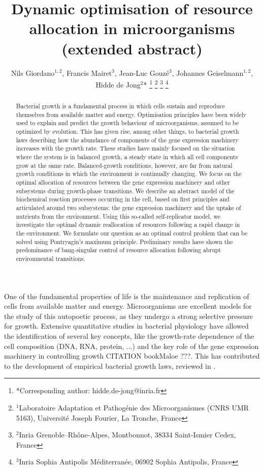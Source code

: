 \documentclass[a4paper, 10pt, conference]{ieeeconf}      %
\title{\LARGE \bf
Dynamic optimisation of resource allocation in microorganisms (extended abstract)
}
\author{Nils Giordano$^{1,2}$, Francis Mairet$^{3}$, Jean-Luc Gouzé$^{3}$, Johannes Geiselmann$^{1,2}$, Hidde de Jong$^{2}$*%
\thanks{*Corresponding author: hidde.de-jong@inria.fr}%
\thanks{$^{1}$Laboratoire Adaptation et Pathog\'enie des Microorganismes (CNRS UMR 5163),
Universit\'e Joseph Fourier,
La Tronche, France}
\thanks{$^{2}$Inria Grenoble--Rh\^one-Alpes, Montbonnot, 38334 Saint-Ismier Cedex, France}
\thanks{$^{3}$Inria Sophia Antipolis M\'editerran\'ee, 06902 Sophia Antipolis, France}
}
\begin{document}
\maketitle
\thispagestyle{empty}
\pagestyle{empty}
\begin{abstract}

Bacterial growth is a fundamental process in which cells sustain and reproduce themselves from available matter and energy.
Optimisation principles have been widely used to explain and predict the growth behaviour of microorganisms, assumed to be optimized by evolution.
This has given rise, among other things, to bacterial growth laws describing how the abundance of components of the gene expression machinery increases with the growth rate. These studies have mainly focused on the situation where the system is in balanced growth, a steady state in which all cell components grow at the same rate.
Balanced-growth conditions, however, are far from natural growth conditions in which the environment is continually changing.
We focus on the optimal allocation of resources between the gene expression machinery and other subsystems during growth-phase transitions.
We describe an abstract model of the biochemical reaction processes occurring in the cell, based on first principles and articulated around two subsystems: the gene expression machinery and the uptake of nutrients from the environment.
Using this so-called self-replicator model, we investigate the optimal dynamic reallocation of resources following a rapid change in the environment.
We formulate our question as an optimal control problem that can be solved using Pontryagin's maximum principle.
Preliminary results have shown the predominance of bang-singular control of resource allocation following abrupt environmental transitions.
\end{abstract}

One of the fundamental properties of life is the maintenance and replication of cells from available matter and energy.
Microorganisms are excellent models for the study of this autopoetic process, as they undergo a strong selective pressure for growth.
Extensive quantitative studies in bacterial physiology have allowed the identification of several key concepts, like the growth-rate dependence of the cell composition (DNA, RNA, protein, ...) and the key role of the gene expression machinery in controlling growth \cite{scott_interdependence_2010,bremer_modulation_1996,bookMaloe} {\color{blue} CITATION bookMaloe ???}.
This has contributed to the development of empirical bacterial growth laws, reviewed in \cite{scott_bacterial_2011}.
\end{document}
